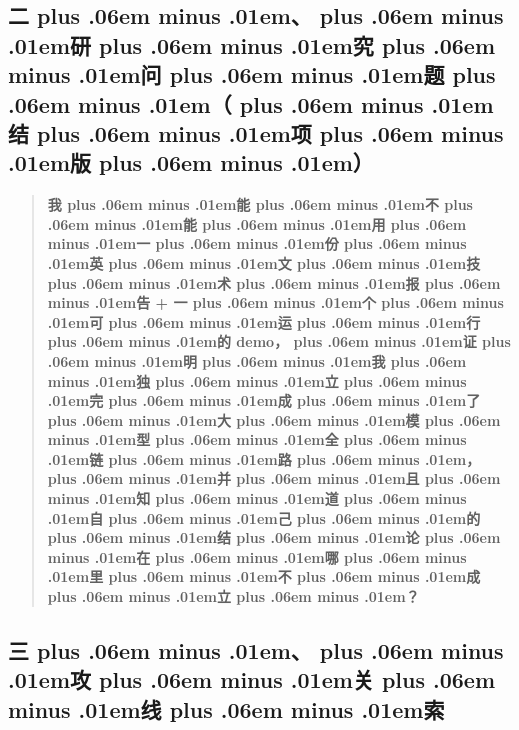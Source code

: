 \documentclass[
]{article}
\def\zh#1{{\zhfont #1}}
\def\zhglue{\hskip0pt plus .06em minus .01em}
\begin{document}
\subsection{\zh{二\zhglue 、\zhglue 研\zhglue 究\zhglue 问\zhglue 题\zhglue （\zhglue 结\zhglue 项\zhglue 版\zhglue ）}}\label{ux4e8cux7814ux7a76ux95eeux9898ux7ed3ux9879ux7248}

\begin{quote}
\textbf{\zh{我\zhglue 能\zhglue 不\zhglue 能\zhglue 用\zhglue 一\zhglue 份\zhglue 英\zhglue 文\zhglue 技\zhglue 术\zhglue 报\zhglue 告} + \zh{一\zhglue 个\zhglue 可\zhglue 运\zhglue 行\zhglue 的} demo\zh{，\zhglue 证\zhglue 明\zhglue 我\zhglue 独\zhglue 立\zhglue 完\zhglue 成\zhglue 了\zhglue 大\zhglue 模\zhglue 型\zhglue 全\zhglue 链\zhglue 路\zhglue ，\zhglue 并\zhglue 且\zhglue 知\zhglue 道\zhglue 自\zhglue 己\zhglue 的\zhglue 结\zhglue 论\zhglue 在\zhglue 哪\zhglue 里\zhglue 不\zhglue 成\zhglue 立\zhglue ？}}
\end{quote}

\subsection{\zh{三\zhglue 、\zhglue 攻\zhglue 关\zhglue 线\zhglue 索}}\label{ux4e09ux653bux5173ux7ebfux7d22}
\end{document}
